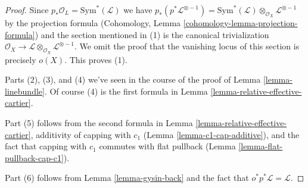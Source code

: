 \documentclass[10pt,a4paper]{amsart}
\theoremstyle{plain}
\theoremstyle{definition}
\theoremstyle{remark}
\numberwithin{equation}{subsection}
\begin{document}
\begin{proof}
Since $p_*\mathcal{O}_L = \text{Sym}^*(\mathcal{L})$ we have
$p_*(p^*\mathcal{L}^{\otimes -1}) =
\text{Sym}^*(\mathcal{L}) \otimes_{\mathcal{O}_X} \mathcal{L}^{\otimes -1}$
by the projection formula
(Cohomology, Lemma \ref{cohomology-lemma-projection-formula})
and the section mentioned in (1) is
the canonical trivialization $\mathcal{O}_X \to
\mathcal{L} \otimes_{\mathcal{O}_X} \mathcal{L}^{\otimes -1}$.
We omit the proof that the vanishing locus of
this section is precisely $o(X)$. This proves (1).

\medskip\noindent
Parts (2), (3), and (4) we've seen in the course of the proof of
Lemma \ref{lemma-linebundle}. Of course (4) is the first
formula in Lemma \ref{lemma-relative-effective-cartier}.

\medskip\noindent
Part (5) follows from the second formula in
Lemma \ref{lemma-relative-effective-cartier},
additivity of capping with $c_1$ (Lemma \ref{lemma-c1-cap-additive}),
and the fact that capping with $c_1$ commutes with flat pullback
(Lemma \ref{lemma-flat-pullback-cap-c1}).

\medskip\noindent
Part (6) follows from Lemma \ref{lemma-gysin-back}
and the fact that $o^*p^*\mathcal{L} = \mathcal{L}$.
\end{proof}
\end{document}

